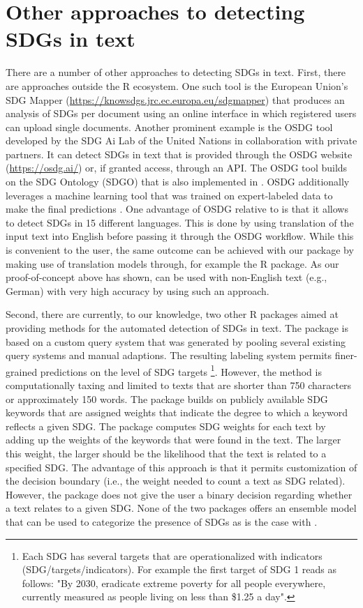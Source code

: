 \section{Other approaches to detecting SDGs in text}
There are a number of other approaches to detecting SDGs in text. First, there are approaches outside the R ecosystem. One such tool is the European Union's SDG Mapper (\url{https://knowsdgs.jrc.ec.europa.eu/sdgmapper}) that  produces an analysis of SDGs per document using an online interface in which registered users can upload single documents. Another prominent example is the OSDG tool developed by the SDG Ai Lab of the United Nations in collaboration with private partners. It can detect SDGs in text that is provided through the OSDG website (\url{https://osdg.ai/}) or, if granted access, through an API. The OSDG tool builds on the SDG Ontology (SDGO) that is also implemented in . OSDG additionally leverages a machine learning tool that was trained on expert-labeled data to make the final predictions \citep{OSDG2}. One advantage of OSDG relative to  is that it allows to detect SDGs in 15 different languages. This is done by using translation of the input text into English before passing it through the OSDG workflow. While this is convenient to the user, the same outcome can be achieved with our package by making use of translation models through, for example the  R package. As our proof-of-concept above has shown,  can be used with non-English text (e.g., German) with very high accuracy by using such an approach. 

Second, there are currently, to our knowledge, two other R packages aimed at providing methods for the automated detection of SDGs in text. The  package is based on a custom query system that was generated by pooling several existing query systems and manual adaptions. The resulting labeling system permits finer-grained predictions on the level of SDG targets \footnote{Each SDG has several targets that are operationalized with indicators (SDG/targets/indicators). For example the first target of SDG 1 reads as follows: "By 2030, eradicate extreme poverty for all people everywhere, currently measured as people living on less than \$1.25 a day".}. However, the method is computationally taxing and limited to texts that are shorter than 750 characters or approximately 150 words. The  package builds on publicly available SDG keywords that are assigned weights that indicate the degree to which a keyword reflects a given SDG. The package computes SDG weights for each text by adding up the weights of the keywords that were found in the text. The larger this weight, the larger should be the likelihood that the text is related to a specified SDG. The advantage of this approach is that it permits customization of the decision boundary (i.e., the weight needed to count a text as SDG related). However, the package does not give the user a binary decision regarding whether a text relates to a given SDG. None of the two packages offers an ensemble model that can be used to categorize the presence of SDGs as is the case with .

